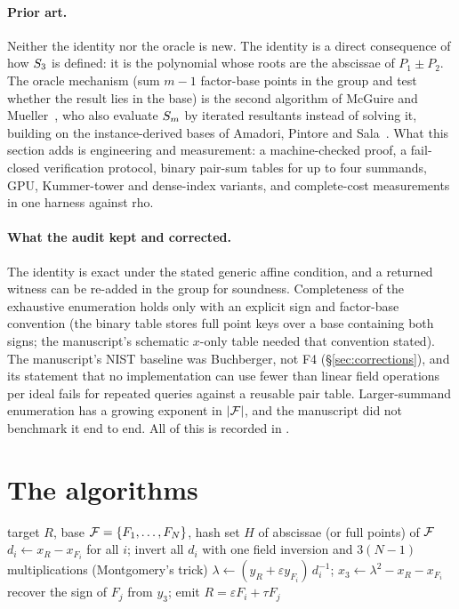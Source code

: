 \paragraph{Prior art.} Neither the identity nor the oracle is new. The
identity is a direct consequence of how $S_{3}$ is defined: it is the
polynomial whose roots are the abscissae of $P_1\pm P_2$. The oracle
mechanism (sum $m-1$ factor-base points in the group and test whether the
result lies in the base) is the second algorithm of McGuire and
Mueller~\cite{mcguire2017}, who also evaluate $S_{m}$ by iterated
resultants instead of solving it, building on the instance-derived bases of
Amadori, Pintore and Sala~\cite{aps2018}. What this section adds is
engineering and measurement: a machine-checked proof, a fail-closed
verification protocol, binary pair-sum tables for up to four summands,
GPU, Kummer-tower and dense-index variants, and complete-cost measurements
in one harness against rho.

\paragraph{What the audit kept and corrected.} The identity is exact under
the stated generic affine condition, and a returned witness can be re-added
in the group for soundness. Completeness of the exhaustive enumeration
holds only with an explicit sign and factor-base convention (the binary
table stores full point keys over a base containing both signs; the
manuscript's schematic $x$-only table needed that convention stated). The
manuscript's NIST baseline was Buchberger, not F4
(\S\ref{sec:corrections}), and its statement that no implementation can
use fewer than linear field operations per ideal fails for repeated
queries against a reusable pair table. Larger-summand enumeration has a
growing exponent in $\lvert \mathcal{F} \rvert$, and the manuscript did not benchmark it end
to end. All of this is recorded in
.

\section{The algorithms}

\begin{algorithm}[t]
\caption[]{Prime two-summand oracle by direct subtraction}\label{alg:prime}
\begin{algorithmic}[1]
\Require target $R$, base $\mathcal{F}=\{F_1,\ldots,F_N\}$, hash set $H$ of
abscissae (or full points) of $\mathcal{F}$
\State $d_i\gets x_R-x_{F_i}$ for all $i$; invert all $d_i$ with one
  field inversion and $3(N-1)$ multiplications (Montgomery's trick)
    \State $\lambda\gets(y_R+\varepsilon y_{F_i})\,d_i^{-1}$;\quad
           $x_3\gets\lambda^2-x_R-x_{F_i}$ 
     recover the sign of $F_j$ from $y_3$; emit
      $R=\varepsilon F_i+\tau F_j$ \EndIf
  \EndFor
\EndFor
\end{algorithmic}
\end{algorithm}

